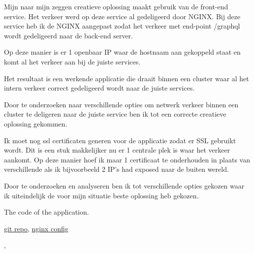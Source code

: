 {{{			Mijn naar mijn zeggen creatieve oplossing maakt gebruik van de front-end service.
			Het verkeer werd op deze service al gedeligeerd door NGINX.
			Bij deze service heb ik de NGINX aangepast zodat het verkeer met end-point /graphql wordt gedeligeerd naar de back-end server.

			Op deze manier is er 1 openbaar IP waar de hostnaam aan gekoppeld staat en komt al het verkeer aan bij de juiste services.

		}
		{%
			Het resultaat is een werkende applicatie die draait binnen een cluster waar al het intern verkeer correct gedeligeerd wordt naar de juiste services.
		}
		{%
			Door te onderzoeken naar verschillende opties om netwerk verkeer binnen een cluster te deligeren naar de juiste service ben ik tot een correcte creatieve oplossing gekommen.

			Ik moet nog ssl certificaten generen voor de applicatie zodat er SSL gebruikt wordt.
			Dit is een stuk makkelijker nu er 1 centrale plek is waar het verkeer aankomt.
			Op deze manier hoef ik maar 1 certificaat te onderhouden in plaats van verschillende als ik bijvoorbeeld 2 IP's had exposed naar de buiten wereld.

			Door te onderzoeken en analyseren ben ik tot verschillende opties gekozen waar ik uiteindelijk de voor mijn situatie beste oplossing heb gekozen.

		}
		{
			The code of the application.
		}
	}
	{%
		\href{https://github.com/aladante/product_inventaris}{git repo},
		\href{https://github.com/aladante/product_inventaris/blob/main/front-end/nginx/nginx.conf}{nginx config}

	},
}
